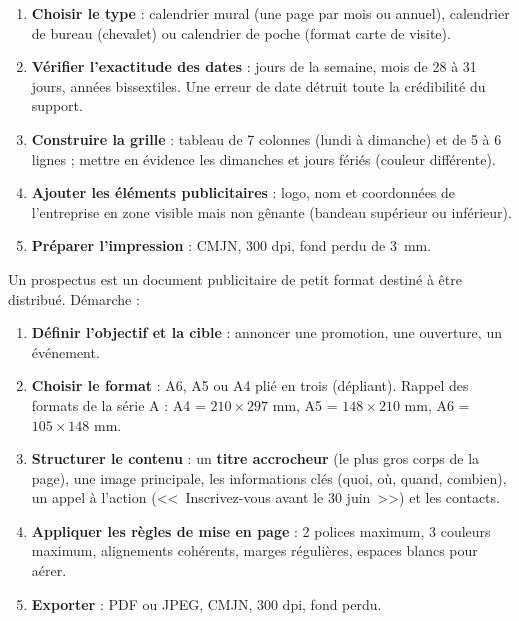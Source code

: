 \documentclass[11pt]{article}
\newcommand{\cle}[1]{{\popxbold\color{popdark}#1}}
\begin{document}
\begin{methode}
\begin{enumerate}
\item \textbf{Choisir le type} : calendrier mural (une page par mois ou annuel), calendrier de bureau (chevalet) ou calendrier de poche (format carte de visite).
\item \textbf{Vérifier l'exactitude des dates} : jours de la semaine, mois de 28 à 31 jours, années bissextiles. Une erreur de date détruit toute la crédibilité du support.
\item \textbf{Construire la grille} : tableau de 7 colonnes (lundi à dimanche) et de 5 à 6 lignes ; mettre en évidence les dimanches et jours fériés (couleur différente).
\item \textbf{Ajouter les éléments publicitaires} : logo, nom et coordonnées de l'entreprise en zone visible mais non gênante (bandeau supérieur ou inférieur).
\item \textbf{Préparer l'impression} : CMJN, 300 dpi, fond perdu de \SI{3}{mm}.
\end{enumerate}
\end{methode}

\begin{methode}
Un \cle{prospectus} est un document publicitaire de petit format destiné à être distribué. Démarche :
\begin{enumerate}
\item \textbf{Définir l'objectif et la cible} : annoncer une promotion, une ouverture, un événement.
\item \textbf{Choisir le format} : A6, A5 ou A4 plié en trois (dépliant). Rappel des formats de la série A : A4 = $210 \times 297$ mm, A5 = $148 \times 210$ mm, A6 = $105 \times 148$ mm.
\item \textbf{Structurer le contenu} : un \textbf{titre accrocheur} (le plus gros corps de la page), une image principale, les informations clés (quoi, où, quand, combien), un \cle{appel à l'action} (<<~Inscrivez-vous avant le 30 juin~>>) et les contacts.
\item \textbf{Appliquer les règles de mise en page} : 2 polices maximum, 3 couleurs maximum, alignements cohérents, marges régulières, espaces blancs pour aérer.
\item \textbf{Exporter} : PDF ou JPEG, CMJN, 300 dpi, fond perdu.
\end{enumerate}
\end{methode}
\end{document}
